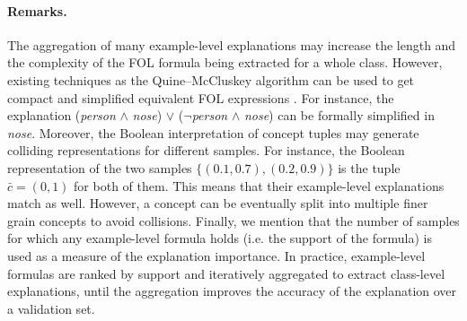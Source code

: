 \paragraph{Remarks.} The aggregation of many example-level explanations may increase the length and the complexity of the FOL formula being extracted for a whole class. However, existing techniques as the Quine–McCluskey algorithm can be used to get compact and simplified equivalent FOL expressions \citep{mccoll1878calculus,quine1952problem,mccluskey1956minimization}. For instance, the explanation (\textit{person} $\wedge$ \textit{nose}) $\vee$ ($\neg$\textit{person} $\wedge$ \textit{nose}) can be formally simplified in \textit{nose}.
Moreover, the Boolean interpretation of concept tuples may generate colliding representations for different samples. For instance, the Boolean representation of the two samples $\{ (0.1, 0.7), (0.2, 0.9) \}$ is the tuple $\bar{c} = (0, 1)$ for both of them. This means that their example-level explanations match as well. %
However, a concept can be eventually split into multiple finer grain concepts to avoid collisions. Finally, we mention that the number of samples for which any example-level formula holds (i.e. the support of the formula) is used as a measure of the explanation importance. In practice, example-level formulas are ranked by support and iteratively aggregated to extract class-level explanations, until the aggregation improves the accuracy of the explanation over a validation set.

